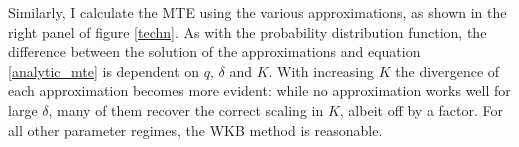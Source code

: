 Similarly, I calculate the MTE using the various approximations, as shown in the right panel of figure \ref{techn}. 
As with the probability distribution function, the difference between the solution of the approximations and equation \ref{analytic_mte} is dependent on $q$, $\delta$ and $K$. 
With increasing $K$ the divergence of each approximation becomes more evident: 
while no approximation works well for large $\delta$, many of them recover the correct scaling in $K$, albeit off by a factor. %
For all other parameter regimes, the WKB method is reasonable. %


